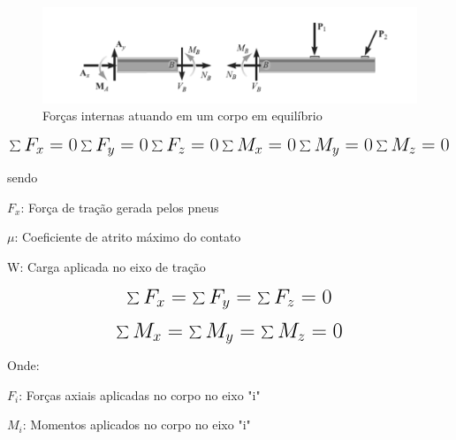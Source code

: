 
\begin{figure}[htb]
	\caption{\label{fig:1010} Forças internas atuando em um corpo em equilíbrio}
	\begin{center}
		\includegraphics[width=\textwidth]{pictures/1010.png}
	\end{center}
\end{figure}



\begin{equation}\label{eq:Eq_101}%
\mbox{\fontsize{17.28}{21.6}\selectfont\( %
\sum F_{x} = 0 \sum F_{y} = 0 \sum F_{z} = 0
\sum M_{x} = 0 \sum M_{y} = 0 \sum M_{z} = 0
\)} %
\end{equation}

\newline

sendo

$F_{x}$: Força de tração gerada pelos pneus

$\mu$: Coeficiente de atrito máximo do contato

W: Carga aplicada no eixo de tração


\begin{equation}\label{eq:Eq_110}%
\mbox{\fontsize{17.28}{21.6}\selectfont\( %
\sum F_{x} = \sum F_{y} = \sum F_{z} = 0
\)} %
\end{equation}

\begin{equation}\label{eq:Eq_120}%
\mbox{\fontsize{17.28}{21.6}\selectfont\( %
\sum M_{x} = \sum M_{y} = \sum M_{z} = 0
\)} %
\end{equation}

Onde:

$F_{i}$: Forças axiais aplicadas no corpo no eixo "i"

$M_{i}$: Momentos aplicados no corpo no eixo "i"







